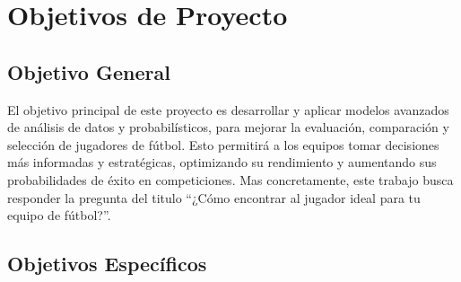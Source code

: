 \documentclass[
  a4paper,
]{article}
\begin{document}
\hypertarget{objetivos-de-proyecto}{%
\section{\texorpdfstring{\textbf{Objetivos de
Proyecto}}{Objetivos de Proyecto}}\label{objetivos-de-proyecto}}

\hypertarget{objetivo-general}{%
\subsection{Objetivo General}\label{objetivo-general}}

El objetivo principal de este proyecto es desarrollar y aplicar modelos
avanzados de análisis de datos y probabilísticos, para mejorar la
evaluación, comparación y selección de jugadores de fútbol. Esto
permitirá a los equipos tomar decisiones más informadas y estratégicas,
optimizando su rendimiento y aumentando sus probabilidades de éxito en
competiciones. Mas concretamente, este trabajo busca responder la
pregunta del titulo ``¿Cómo encontrar al jugador ideal para tu equipo de
fútbol?''.

\hypertarget{objetivos-especuxedficos}{%
\subsection{Objetivos Específicos}\label{objetivos-especuxedficos}}
\end{document}

